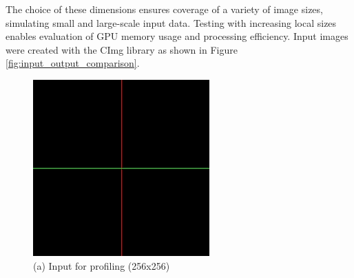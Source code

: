 \documentclass{article}
\begin{document}
The choice of these dimensions ensures coverage of a variety of image sizes, simulating small and large-scale input data. Testing with increasing local sizes enables evaluation of GPU memory usage and processing efficiency. Input images were created with the CImg library as shown in Figure \ref{fig:input_output_comparison}.

\begin{figure}[h!]
    \captionsetup[subfigure]{labelformat=empty}
        \centering
        \begin{minipage}{0.45\textwidth}
            \centering
            \includegraphics[width=\textwidth]{./images/input_256x256.jpg} %
            \caption*{(a) Input for profiling (256x256)}
        \end{minipage}
        \hfill
        \begin{minipage}{0.45\textwidth}
            \centering

\end{minipage}
\end{figure}
\end{document}
